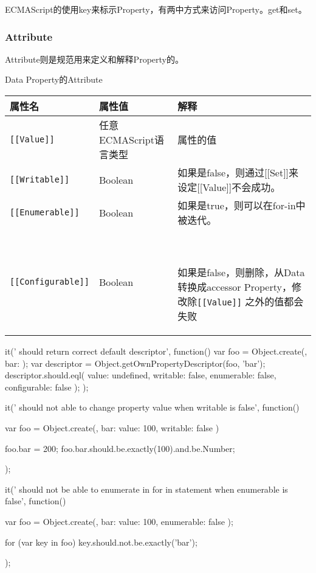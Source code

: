 ECMAScript的使用key来标示Property，有两中方式来访问Property。get和set。

\subsubsection{Attribute}
Attribute则是规范用来定义和解释Property的。

Data Property的Attribute

\begin{tabular}{|l|l|l|}
\hline
属性名 & 属性值 & 解释 \\
\hline
\lstinline![[Value]]! & 任意ECMAScript语言类型 & 属性的值 \\
\hline
\lstinline![[Writable]]! & Boolean & 如果是false，则通过[[Set]]来设定[[Value]]不会成功。 \\
\hline
\lstinline![[Enumerable]]! & Boolean & 如果是true，则可以在for-in中被迭代。 \\
\hline
\lstinline![[Configurable]]! & Boolean &　\parbox[t]{8cm}{如果是false，则删除，从Data转换成accessor Property，修改除\lstinline![[Value]]! 之外的值都会失败}\\
\hline
\end{tabular}

\begin{JavaScript}
		it(' should return correct default descriptor', function(){
			var foo  = Object.create({}, {
				bar: {}
			});
			var descriptor = Object.getOwnPropertyDescriptor(foo, 'bar');
			descriptor.should.eql(
				{
					value: undefined, 
					writable: false, 
					enumerable: false, 
					configurable: false
				});
		});
\end{JavaScript}

\begin{JavaScript}
		it(' should not able to change property value when writable is false', function(){
			var foo = Object.create({}, {
				bar: {value: 100, writable: false}
			})

			foo.bar = 200;
			foo.bar.should.be.exactly(100).and.be.Number;
		});
\end{JavaScript}

\begin{JavaScript}
		it(' should not be able to enumerate in for in statement when enumerable is false', function(){
			var foo = Object.create({}, {
				bar: {value: 100, enumerable: false}
			});

			for (var key in foo)
			{
				key.should.not.be.exactly('bar');
			}
		});
\end{JavaScript}

